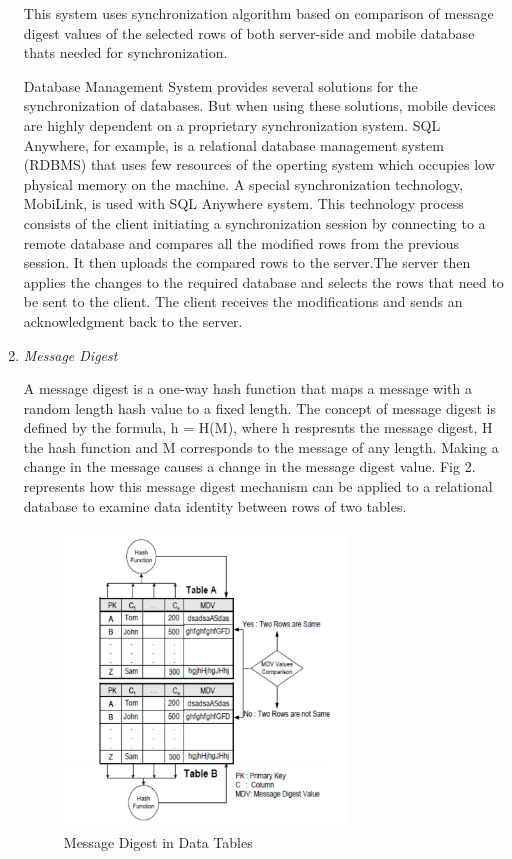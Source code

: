 \documentclass[conference]{IEEEtran}
\begin{document}
\begin{enumerate}[label=(\Alph*)]
This system uses synchronization algorithm based on comparison of message digest values of the selected rows of both server-side and mobile database thats needed for synchronization.

Database Management System provides several solutions for the synchronization of databases. But when using these solutions, mobile devices are highly dependent on a proprietary synchronization system. SQL Anywhere, for example, is a relational database management system (RDBMS) that uses few resources of the operting system which occupies low physical memory on the machine. A special synchronization technology, MobiLink, is used with SQL Anywhere system. This technology process consists of the client initiating a synchronization session by connecting to a remote database and compares all the modified rows from the previous session. It then uploads the compared rows to the server.The server then applies the changes to the required database and selects the rows that need to be sent to the client. The client receives the modifications and sends an acknowledgment back to the server.

\item \textit{Message Digest}

A message digest is a one-way hash function that maps a message with a random length hash value to a fixed length. The concept of message digest is defined by the formula, h = H(M), where h respresnts the message digest, H the hash function and M corresponds to the message of any length. Making a change in the message causes a change in the message digest value. Fig 2. represents how this message digest mechanism can be applied to a relational database to examine data identity between rows of two tables.

\begin{figure}[h]
	\centering
	\includegraphics[trim={1cm 0 1.5cm 0},width=7.5cm]{data.png} 
	\caption{Message Digest in Data Tables}
	\label{fig:data1}
\end{figure}



\end{enumerate}
\end{document}
